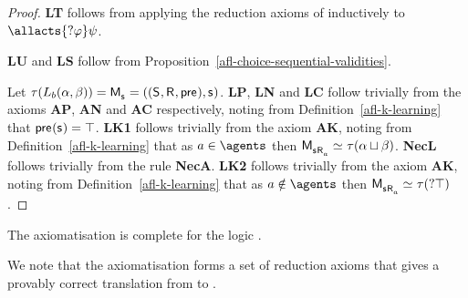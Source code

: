 \begin{proof}
{\bf LT} follows from applying the reduction axioms of \axiomAmlK{} inductively to $\allacts{\test{\phi}} \psi$.

{\bf LU} and {\bf LS} follow from Proposition~\ref{afl-choice-sequential-validities}.

Let $\tau(\learns_\agentB (\alpha, \beta)) = \aPModel{\aStateS} = \aPModelTuple{\aStateS}$.
{\bf LP}, {\bf LN} and {\bf LC} follow trivially from the \axiomAmlK{} axioms {\bf AP}, {\bf AN} and {\bf AC} respectively, noting from Definition~\ref{afl-k-learning} that $\aPrecondition(\aStateS) = \top$.
{\bf LK1} follows trivially from the \axiomAmlK{} axiom {\bf AK}, noting from Definition~\ref{afl-k-learning} that as $\agentA \in \agents$ then $\aPModel{\aStateS \aAccessibility{\agentA}} \bisimilar \tau(\alpha \choice \beta)$.
{\bf NecL} follows trivially from the \axiomAmlK{} rule {\bf NecA}.
{\bf LK2} follows trivially from the \axiomAmlK{} axiom {\bf AK}, noting from Definition~\ref{afl-k-learning} that as $\agentA \notin \agents$ then $\aPModel{\aStateS \aAccessibility{\agentA}} \bisimilar \tau(\test{\top})$.
\end{proof}

\begin{proposition}\label{afl-k-axioms-completeness}
The axiomatisation \axiomAflK{} is complete for the logic \logicAmlK{}.
\end{proposition}

We note that the axiomatisation \axiomAflK{} forms a set of reduction axioms that gives a provably correct translation from \langAfl{} to \lang{}.

